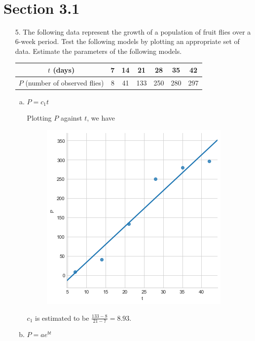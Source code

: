 \documentclass[10pt]{report}
\title{
	\courseTitle\\
	\hwNo\\
	\hwDate
}
\author{\hwAuther}
\date{}
\begin{document}
\maketitle

\section*{Section 3.1}
\begin{enumerate}
	\item [5.]
	The following data represent the growth of a population of fruit flies over a 6-week period. Test the following models by plotting an appropriate set of data. Estimate the parameters of the following models.
	\begin{table}[H]
		\centering
		\begin{tabular}{*{7}{c}} 
			\toprule
			$t$ (days) & 7 & 14 & 21 & 28 & 35 & 42 \\ \midrule
			$P$ (number of observed flies) & 8 & 41 & 133 & 250 & 280 & 297 \\
			\bottomrule
		\end{tabular}
	\end{table}
	\begin{enumerate}[a.]
		\item 
		$P = c_1 t$
		
		Plotting $P$ against $t$, we have
		\begin{figure}[H]
			\centering
			\includegraphics[width=0.4\linewidth]{s3_1/5a.png}
		\end{figure}
		$c_1$ is estimated to be $\frac{133-8}{21-7} = 8.93$.
	
		\item 
		$P = a e^{bt}$
		

\end{enumerate}
\end{enumerate}
\end{document}
